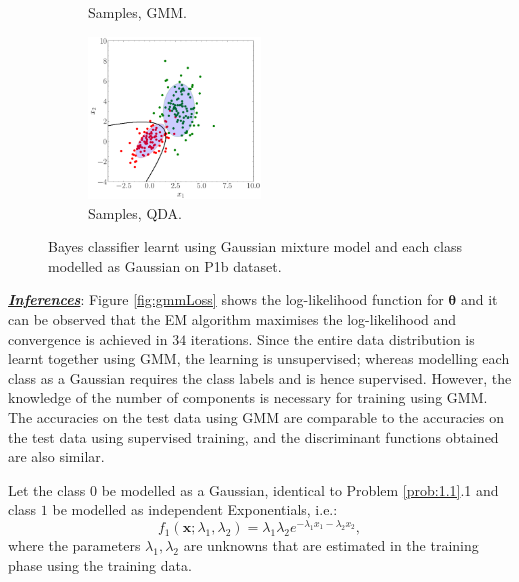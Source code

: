 \documentclass[12pt, a4 paper]{article}
\newcommand{\bx}{\mathbf{x}}
\newcommand{\btheta}{\boldsymbol{\theta}}
\begin{document}
\begin{figure}[!htbp]
\begin{subfigure}[!htbp]{0.24\textwidth}
       \caption{Samples, GMM.}
       \label{fig:GMM_DF_P1b}
    \end{subfigure}
\quad \quad
    \begin{subfigure}[!htbp]{0.24\textwidth}
       \centering
       \includegraphics[width=1.8in]{../results/ex1/samples_QD_ML_dataset_P1b_size_199.pdf}
       \caption{Samples, QDA.}
       \label{fig:QDA_DF_P1b}
    \end{subfigure}
\caption{Bayes classifier learnt using Gaussian mixture model and each class modelled as Gaussian on P1b dataset.}
\label{fig:ex12P1b}
\end{figure}
\underline {\it \bfseries Inferences}: Figure \ref{fig:gmmLoss} shows the log-likelihood function for $\btheta$ and it can be observed that the EM algorithm maximises the log-likelihood and convergence is achieved in $34$ iterations. Since the entire data distribution is learnt together using GMM, the learning is unsupervised; whereas modelling each class as a Gaussian requires the class labels and is hence supervised. However, the knowledge of the number of components is necessary for training using GMM. The accuracies on the test data using GMM are comparable to the accuracies on the test data using supervised training, and the discriminant functions obtained are also similar.


\label{prob:1.3}
Let the class $0$ be modelled as a Gaussian, identical to Problem \ref{prob:1.1}.1 and class $1$ be modelled as independent Exponentials, i.e.:
\begin{equation}
	f_{1}(\bx; \lambda_{1}, \lambda_{2}) = \lambda_{1}\lambda_{2} e^{-\lambda_{1}x_{1} -\lambda_{2}x_{2}},
\label{eq:expConditionalModel}
\end{equation}
where the parameters $\lambda_{1}, \lambda_{2}$ are unknowns that are estimated in the training phase using the training data. \\
\end{document}

